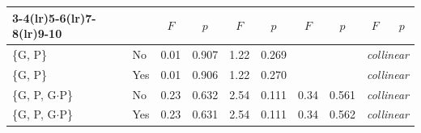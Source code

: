 \begin{tabular}{@{}llcccccccc@{}}
\cmidrule(lr){3-4}\cmidrule(lr){5-6}\cmidrule(lr){7-8}\cmidrule(lr){9-10}
 & & $F$ & $p$ & $F$ & $p$ & $F$ & $p$ & $F$ & $p$ \\
\midrule
\{G, P\} & No & 0.01 & 0.907 & 1.22 & 0.269 &  &  & \multicolumn{2}{c}{\textit{collinear}} \\
\{G, P\} & Yes & 0.01 & 0.906 & 1.22 & 0.270 &  &  & \multicolumn{2}{c}{\textit{collinear}} \\
\{G, P, G$\cdot$P\} & No & 0.23 & 0.632 & 2.54 & 0.111 & 0.34 & 0.561 & \multicolumn{2}{c}{\textit{collinear}} \\
\{G, P, G$\cdot$P\} & Yes & 0.23 & 0.631 & 2.54 & 0.111 & 0.34 & 0.562 & \multicolumn{2}{c}{\textit{collinear}} \\
\bottomrule
\end{tabular}
